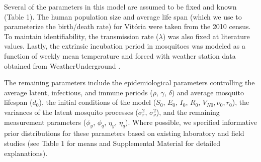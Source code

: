 \documentclass[10pt,letterpaper]{article}
\begin{document}
Several of the parameters in this model are assumed to be fixed and known (Table 1).
The human population size and average life span (which we use to parameterize the birth/death rate) for Vit\'oria were taken from the 2010 census.
To maintain identifiability, the transmission rate ($\lambda$) was also fixed at literature values.
Lastly, the extrinsic incubation period in mosquitoes was modeled as a function of weekly mean temperature and forced with weather station data obtained from WeatherUnderground \cite{weather}.

The remaining parameters include the epidemiological parameters controlling the average latent, infectious, and immune periods ($\rho$, $\gamma$, $\delta$) and average mosquito lifespan ($d_0$), the initial conditions of the model ($S_0$, $E_0$, $I_0$, $R_0$, $V_{N0}, \nu_0, r_0$), the variances of the latent mosquito processes ($\sigma^2_r$, $\sigma^2_{\nu}$), and the remaining measurement parameters ($\phi_y$, $\phi_q$, $\eta_y$, $\eta_q$).  
Where possible, we specified informative prior distributions for these parameters based on existing laboratory and field studies (see Table 1 for means and Supplemental Material for detailed explanations).
\end{document}
